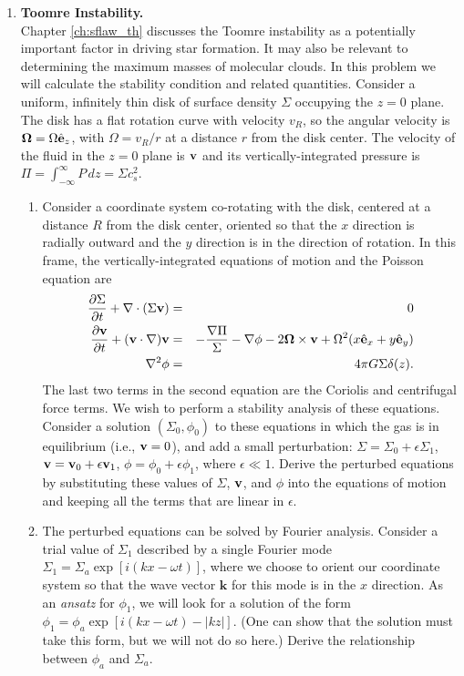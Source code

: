 \problemset

\begin{enumerate}

\item \textbf{Toomre Instability.}\\
Chapter \ref{ch:sflaw_th} discusses the Toomre instability as a potentially important factor in driving star formation. It may also be relevant to determining the maximum masses of molecular clouds. In this problem we will calculate the stability condition and related quantities. Consider a uniform, infinitely thin disk of surface density $\Sigma$ occupying the $z=0$ plane. The disk has a flat rotation curve with velocity $v_R$, so the angular velocity is ${\bm \Omega}=\Omega \hat{\mathbf{e}}_z$, with $\Omega = v_R/r$ at a distance $r$ from the disk center. The velocity of the fluid in the $z=0$ plane is $\mathbf{v}$ and its vertically-integrated pressure is $\Pi=\int_{-\infty}^{\infty} P \, dz = \Sigma c_s^2$. 
\begin{enumerate}
\item Consider a coordinate system co-rotating with the disk, centered at a distance $R$ from the disk center, oriented so that the $x$ direction is radially outward and the $y$ direction is in the direction of rotation. In this frame, the vertically-integrated equations of motion and the Poisson equation are
\begin{eqnarray*}
\frac{\partial \Sigma}{\partial t} + \nabla \cdot (\Sigma \mathbf{v}) & = & 0 \\
\frac{\partial \mathbf{v}}{\partial t} + (\mathbf{v}\cdot\nabla)\mathbf{v} & = & -\frac{\nabla \Pi}{\Sigma} - \nabla \phi - 2{\bm \Omega} \times \mathbf{v} + \Omega^2 (x \hat{\mathbf{e}}_x + y \hat{\mathbf{e}}_y) \\
\nabla^2 \phi & = & 4 \pi G \Sigma \delta(z).
\end{eqnarray*}
The last two terms in the second equation are the Coriolis and centrifugal force terms.
We wish to perform a stability analysis of these equations. Consider a solution $(\Sigma_0, \phi_0)$ to these equations in which the gas is in equilibrium (i.e., $\mathbf{v}=0$), and add a small perturbation: $\Sigma=\Sigma_0 + \epsilon \Sigma_1$, $\mathbf{v} = \mathbf{v}_0 + \epsilon \mathbf{v}_1$, $\phi=\phi_0 + \epsilon \phi_1$, where $\epsilon \ll 1$. Derive the perturbed equations by substituting these values of $\Sigma$, $\mathbf{v}$, and $\phi$ into the equations of motion and keeping all the terms that are linear in $\epsilon$.
\item The perturbed equations can be solved by Fourier analysis. Consider a trial value of $\Sigma_1$ described by a single Fourier mode $\Sigma_1 = \Sigma_a \exp[i(kx - \omega t)]$, where we choose to orient our coordinate system so that the wave vector $\mathbf{k}$ for this mode is in the $x$ direction. As an {\it ansatz} for $\phi_1$, we will look for a solution of the form $\phi_1 = \phi_a \exp[i(kx - \omega t) - |k z|]$. (One can show that the solution must take this form, but we will not do so here.) Derive the relationship between $\phi_a$ and $\Sigma_a$.

\end{enumerate}
\end{enumerate}
